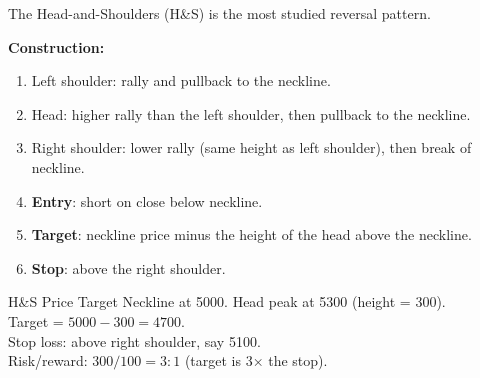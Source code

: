 \documentclass[12pt,a4paper,openany]{report}
\theoremstyle{definition}
\begin{document}
The Head-and-Shoulders (H\&S) is the most studied reversal pattern.

\begin{center}
\end{center}

\textbf{Construction:}
\begin{enumerate}[label=\arabic*.]
  \item Left shoulder: rally and pullback to the neckline.
  \item Head: higher rally than the left shoulder, then pullback to the neckline.
  \item Right shoulder: lower rally (same height as left shoulder), then break of neckline.
  \item \textbf{Entry}: short on close below neckline.
  \item \textbf{Target}: neckline price minus the height of the head above the neckline.
  \item \textbf{Stop}: above the right shoulder.
\end{enumerate}

\begin{examplebox}{H\&S Price Target}
Neckline at 5000. Head peak at 5300 (height = 300). \\
Target = $5000 - 300 = 4700$. \\
Stop loss: above right shoulder, say 5100. \\
Risk/reward: $300/100 = 3:1$ (target is 3× the stop).
\end{examplebox}
\end{document}
